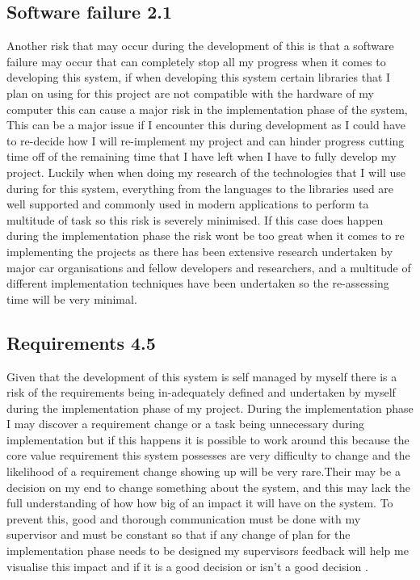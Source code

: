 \subsection{Software failure 2.1}
Another risk that may occur during the development of this is that a software failure may occur that can completely stop all my progress when it comes to developing this system, if when developing this system certain libraries that I plan on using for this project are not compatible with the hardware of my computer this can cause a major risk in the implementation phase of the system, This can be a major issue if I encounter this during development as I could have to re-decide how I will re-implement my project and can hinder progress cutting time off of the remaining time that I have left when I have to fully develop my project. Luckily when when doing my research of the technologies that I will use during for this system, everything from the languages to the libraries used are well supported and commonly used in modern applications to perform ta multitude of task so this risk is severely minimised.  If this case does happen during the implementation phase the risk wont be too great when it comes to re implementing the projects as there has been extensive research undertaken by major car organisations and fellow developers and researchers, and a multitude of different implementation techniques have been undertaken so the re-assessing time will be very minimal.
\subsection{Requirements 4.5}
Given that the development of this system is self managed by myself there is a risk of the requirements being in-adequately defined and undertaken by myself during the implementation phase of my project. During the implementation phase I may discover a requirement change or a task being unnecessary during implementation but if this happens it is possible to work around this because the core value requirement this system possesses are very difficulty to change and the likelihood of a requirement change showing up will be very rare.Their may be a decision on my end to change something about the system, and this may lack the full understanding of how how big of an impact it will have on the system.  To prevent this, good and thorough communication must be done with my supervisor and must be constant so that if any change of plan for the implementation phase needs to be designed my supervisors feedback will help me visualise this impact and if it is a good decision or isn't a good decision .
